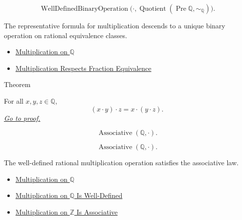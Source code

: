 \begin{remark*}
\[
\operatorname{WellDefinedBinaryOperation}
\bigl(\cdot,\operatorname{Quotient}(\operatorname{Pre}\mathbb{Q},\sim_{\mathbb{Q}})\bigr).
\]
\end{remark*}

\begin{remark*}[Interpretation]
The representative formula for multiplication descends to a unique binary
operation on rational equivalence classes.
\end{remark*}

\begin{dependencies}
\begin{itemize}
  \item \hyperref[def:multiplication-on-q-classes]{Multiplication on $\mathbb{Q}$}
  \item \hyperref[lem:multiplication-on-q-respects-equivalence]{Multiplication Respects Fraction Equivalence}
\end{itemize}
\end{dependencies}

\begin{theorembox}{Theorem}
\begin{theorem}
\label{thm:multiplication-on-q-associative}
For all $x,y,z\in\mathbb{Q}$,
\[
(x\cdot y)\cdot z=x\cdot(y\cdot z).
\]
\hyperref[prf:multiplication-on-q-associative]{\textit{Go to proof.}}
\end{theorem}
\end{theorembox}

\begin{remark*}
\[
\operatorname{Associative}(\mathbb{Q},\cdot).
\]
\end{remark*}

\begin{remark*}
\[
\operatorname{Associative}(\mathbb{Q},\cdot).
\]
\end{remark*}

\begin{remark*}[Interpretation]
The well-defined rational multiplication operation satisfies the associative
law.
\end{remark*}

\begin{dependencies}
\begin{itemize}
  \item \hyperref[def:multiplication-on-q-classes]{Multiplication on $\mathbb{Q}$}
  \item \hyperref[thm:multiplication-on-q-well-defined]{Multiplication on $\mathbb{Q}$ Is Well-Defined}
  \item \hyperref[thm:multiplication-on-z-associative]{Multiplication on $\mathbb{Z}$ Is Associative}
\end{itemize}
\end{dependencies}

